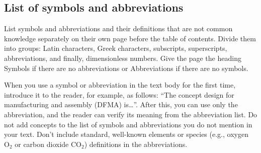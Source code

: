 \subsection*{List of symbols and abbreviations}

List symbols and abbreviations and their definitions that are not common knowledge separately on their own page before the table of contents. Divide them into groups: Latin characters, Greek characters, subscripts, superscripts, abbreviations, and finally, dimensionless numbers. Give the page the heading Symbols if there are no abbreviations or Abbreviations if there are no symbols. 

When you use a symbol or abbreviation in the text body for the first time, introduce it to the reader, for example, as follows: \enquote{The concept design for manufacturing and assembly (DFMA) is\ldots}. After this, you can use only the abbreviation, and the reader can verify its meaning from the abbreviation list. Do not add concepts to the list of symbols and abbreviations you do not mention in your text. Don't include standard, well-known elements or species (e.g., oxygen $\mathrm{O_2}$ or carbon dioxide $\mathrm{CO_2}$) definitions in the abbreviations. 

\clearpage %
